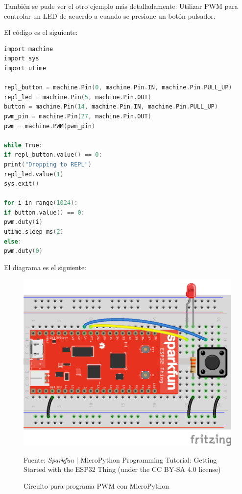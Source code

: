 \documentclass[conference]{IEEEtran}
\begin{document}
También se pude ver el otro ejemplo más detalladamente: Utilizar PWM para controlar un LED de acuerdo a cuando se presione un botón pulsador.

\bigbreak

El código es el siguiente:

\begin{lstlisting}[language=C, caption={Programa que utiliza PWM en MicroPython para ESP32. Fuente: Sparkfun Electronics \cite{hymel}.}]
import machine
import sys
import utime

repl_button = machine.Pin(0, machine.Pin.IN, machine.Pin.PULL_UP)
repl_led = machine.Pin(5, machine.Pin.OUT)
button = machine.Pin(14, machine.Pin.IN, machine.Pin.PULL_UP)
pwm_pin = machine.Pin(27, machine.Pin.OUT)
pwm = machine.PWM(pwm_pin)

while True:
if repl_button.value() == 0:
print("Dropping to REPL")
repl_led.value(1)
sys.exit()

for i in range(1024):
if button.value() == 0:
pwm.duty(i)
utime.sleep_ms(2)
else:
pwm.duty(0)
\end{lstlisting}

El diagrama es el siguiente:

\begin{figure}[H]
\centering
\includegraphics[width=0.3\paperwidth]{images/esp32-micropython-pwm-circuit}
\caption{Circuito para programa PWM con MicroPython} \footnotesize
Fuente: \textit{Sparkfun} $\mid$ MicroPython Programming Tutorial: Getting Started with the ESP32 Thing \cite{hymel} (under the CC BY-SA 4.0 license)
\end{figure}
\end{document}
